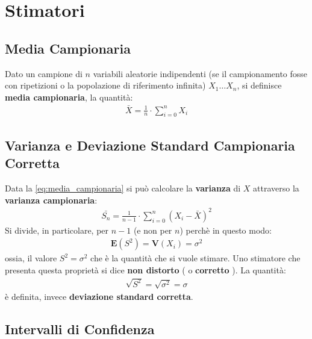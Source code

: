   \chapter{Stimatori}
  \section{Media Campionaria}
	Dato un campione di $n$ variabili aleatorie indipendenti (se il campionamento fosse con ripetizioni o la popolazione di riferimento infinita) $ X_1 \ldots X_n $, si definisce \textbf{media campionaria}, la quantità:
	\begin{equation}
	\label{eq:media_campionaria}
	\begin{split}
		\bar{X} = \frac{1}{n} \cdot \sum_{i=0}^n X_i
	\end{split}
	\end{equation}	    

  \section{Varianza e Deviazione Standard Campionaria Corretta}
  Data la \ref{eq:media_campionaria} si può calcolare la \textbf{varianza} di $X$ attraverso la \textbf{varianza campionaria}: 
	\begin{equation}
	\label{eq:varianza_campionaria}
	\begin{split}
		\bar{S_n} = \frac{1}{n-1} \cdot \sum_{i=0}^n (X_i-\bar{X})^2
	\end{split}
	\end{equation}	      
  Si divide, in particolare, per $n-1$ (e non per $n$) perchè in questo modo:
	\begin{equation}
	\label{eq:stimatore_varianza_corretto}
	\begin{split}
		\mathbf{E}(S^2) = \mathbf{V}(X_i) = \sigma^2
	\end{split}
	\end{equation}	
  ossia, il valore $S^2 = \sigma^2$ che è la quantità che si vuole stimare.
  Uno stimatore che presenta questa proprietà si dice \textbf{non distorto} ( o \textbf{corretto} ).
  La quantità:
	\begin{equation}
	\label{eq:deviazione_standard_corretta}
	\begin{split}
		\sqrt{S^2} = \sqrt{\sigma^2} = \sigma
	\end{split}
	\end{equation}
  è definita, invece \textbf{deviazione standard corretta}.
  \section{Intervalli di Confidenza}   